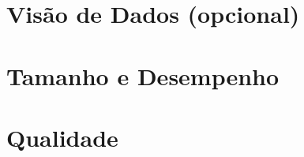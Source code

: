 \section{Visão de Dados (opcional)} %
\label{sec:visao_de_dados}
 

\section{Tamanho e Desempenho} %
\label{sec:tamanho_e_desempenho}
 

\section{Qualidade} %
\label{sec:qualidade}
 
